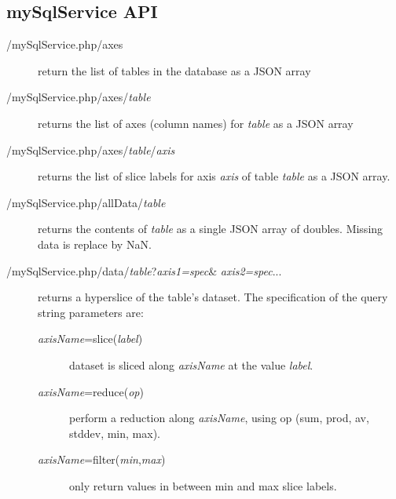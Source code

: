 \documentclass{article}
\begin{document}
\subsection{mySqlService API}

\begin{description}
  \item[/mySqlService.php/axes] return the list of tables in the
    database as a JSON array
  \item[/mySqlService.php/axes/{\em table}] returns the list of axes
    (column names) for {\em table} as a JSON array
  \item[/mySqlService.php/axes/{\em table}/{\em axis}] returns the
    list of slice labels for axis {\em axis} of table {\em table} as a
    JSON array.
  \item[/mySqlService.php/allData/{\em table}] returns the contents
    of {\em table} as a single JSON array of doubles. Missing data
    is replace by NaN.
  \item[/mySqlService.php/data/{\em table}?{\em axis1=spec}\&{\em
      axis2=spec}...] returns a hyperslice of the table's dataset. The
    specification of the query string parameters are:
    \begin{description}
      \item[{\em axisName}=slice({\em label})] dataset is sliced along
        {\em axisName} at the value {\em label}.
      \item[{\em axisName}=reduce({\em op})] perform a reduction along
        {\em axisName}, using op (sum, prod, av, stddev, min, max).
      \item[{\em axisName}=filter({\em min},{\em max})] only return
        values in between min and max slice labels.
    \end{description}
\end{description}


    
\end{document}
